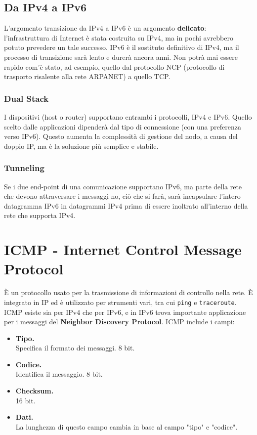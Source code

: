 \subsection{Da IPv4 a IPv6}
L'argomento transizione da IPv4 a IPv6 è un argomento \textbf{delicato}: l'infrastruttura di Internet è stata costruita su IPv4, ma in pochi avrebbero potuto prevedere un tale successo. IPv6 è il sostituto definitivo di IPv4, ma il processo di transizione sarà lento e durerà ancora anni. Non potrà mai essere rapido com'è stato, ad esempio, quello dal protocollo NCP (protocollo di trasporto risalente alla rete ARPANET) a quello TCP.

\subsubsection{Dual Stack}
I dispositivi (host o router) supportano entrambi i protocolli, IPv4 e IPv6. Quello scelto dalle applicazioni dipenderà dal tipo di connessione (con una preferenza verso IPv6).
Questo aumenta la complessità di gestione del nodo, a causa del doppio IP, ma è la soluzione più semplice e stabile.

\subsubsection{Tunneling}
Se i due end-point di una comunicazione supportano IPv6, ma parte della rete che devono attraversare i messaggi no, ciò che si farà, sarà incapsulare l'intero datagramma IPv6 in datagrammi IPv4 prima di essere inoltrato all'interno della rete che supporta IPv4.

\newpage
\section{ICMP - Internet Control Message Protocol}
È un protocollo usato per la trasmissione di informazioni di controllo nella rete. È integrato in IP ed è utilizzato per strumenti vari, tra cui \verb!ping! e \verb|traceroute|.
ICMP esiste sia per IPv4 che per IPv6, e in IPv6 trova importante applicazione per i messaggi del \textbf{Neighbor Discovery Protocol}. ICMP include i campi:
\begin{itemize}
	\item \textbf{Tipo.}\\
	Specifica il formato dei messaggi. 8 bit.
	\item \textbf{Codice.}\\
	Identifica il messaggio. 8 bit.
	\item \textbf{Checksum.}\\
	16 bit.
	\item \textbf{Dati.}\\
	La lunghezza di questo campo cambia in base al campo "tipo" e "codice".
\end{itemize}

